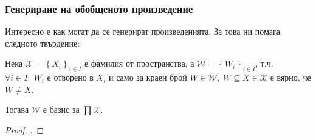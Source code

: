 \subsubsection{Генериране на обобщеното произведение}
Интересно е как могат да се генерират произведенията. За това ни помага следното твърдение:
\begin{proposition}
    Нека $\mathcal X = \left\{X_i\right\}_{i\in I}$ е фамилия от пространства, а $\mathcal W = \left\{W_i\right\}_{i\in I}$, т.ч. $\forall i\in I:\; W_i$ е отворено в $X_i$ и само за краен брой $W \in \mathcal W,\; W \subseteq X \in \mathcal X$ е вярно, че $W \neq X$.

    Тогава $\mathcal W$ е базис за $\prod \mathcal X$.
\end{proposition}
\begin{proof}
    \cite[p.~77]{engelking1989general}.
\end{proof}